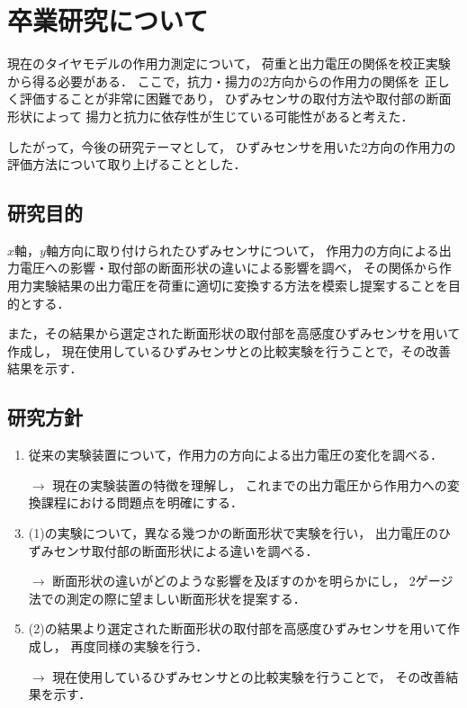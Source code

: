 \documentclass[twocolumn,a4j]{jsarticle}
\begin{document}
\newpage

\section{卒業研究について}

現在のタイヤモデルの作用力測定について，
荷重と出力電圧の関係を校正実験から得る必要がある．
ここで，抗力・揚力の2方向からの作用力の関係を
正しく評価することが非常に困難であり，
ひずみセンサの取付方法や取付部の断面形状によって
揚力と抗力に依存性が生じている可能性があると考えた．\par
したがって，今後の研究テーマとして，
ひずみセンサを用いた2方向の作用力の評価方法について取り上げることとした．\\

\subsection{研究目的}
$x$軸，$y$軸方向に取り付けられたひずみセンサについて，
作用力の方向による出力電圧への影響・取付部の断面形状の違いによる影響を調べ，
その関係から作用力実験結果の出力電圧を荷重に適切に変換する方法を模索し提案することを目的とする．
\par
また，その結果から選定された断面形状の取付部を高感度ひずみセンサを用いて作成し，
現在使用しているひずみセンサとの比較実験を行うことで，その改善結果を示す．\\

\subsection{研究方針}
\begin{enumerate}[(1)]
    \item 従来の実験装置について，作用力の方向による出力電圧の変化を調べる．
    \item [$\rightarrow$] 現在の実験装置の特徴を理解し，
          これまでの出力電圧から作用力への変換課程における問題点を明確にする．
    \item (1)の実験について，異なる幾つかの断面形状で実験を行い，
          出力電圧のひずみセンサ取付部の断面形状による違いを調べる．
    \item [$\rightarrow$] 断面形状の違いがどのような影響を及ぼすのかを明らかにし，
          2ゲージ法での測定の際に望ましい断面形状を提案する．
    \item (2)の結果より選定された断面形状の取付部を高感度ひずみセンサを用いて作成し，
          再度同様の実験を行う．
    \item [$\rightarrow$] 現在使用しているひずみセンサとの比較実験を行うことで，
          その改善結果を示す．
\end{enumerate}
\end{document}
